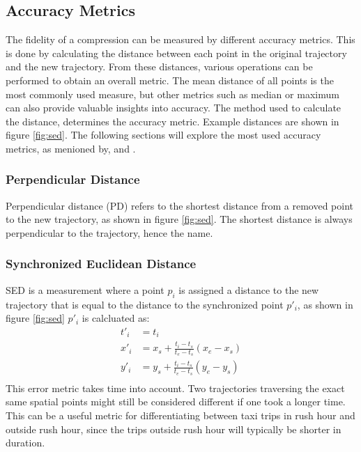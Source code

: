 
\subsection{Accuracy Metrics}
The fidelity of a compression can be measured by different accuracy metrics. This is done by calculating the distance between each point in the original trajectory and the new trajectory. From these distances, various operations can be performed to obtain an overall metric. The mean distance of all points is the most commonly used measure, but other metrics such as median or maximum can also provide valuable insights into accuracy. The method used to calculate the distance, determines the accuracy metric. Example distances are shown in figure \ref{fig:sed}. The following sections will explore the most used accuracy metrics, as menioned by, \cite{TrajFramework} and \cite{Sun2016}.

\subsubsection{Perpendicular Distance}
\label{foobar:PD}
Perpendicular distance (PD) refers to the shortest distance from a removed point to the new trajectory, as shown in figure \ref{fig:sed}. The shortest distance is always perpendicular to the trajectory, hence the name.

\subsubsection{Synchronized Euclidean Distance}
\label{subsub:SED}
SED is a measurement where a point $p_{i}$ is assigned a distance to the new trajectory that is equal to the distance to the synchronized point $p'_{i}$, as shown in figure \ref{fig:sed} $p'_{i}$ is calcluated as:
\begin{equation}
    \begin{aligned}
        t'_{i} & = t_{i}                                                \\
        x'_{i} & = x_{s} + \frac{t_{i}-t_{s}}{t_{e}-t_{s}}(x_{e}-x_{s}) \\
        y'_{i} & = y_{s} + \frac{t_{i}-t_{s}}{t_{e}-t_{s}}(y_{e}-y_{s}) \\
    \end{aligned}
\end{equation}
This error metric takes time into account. Two trajectories traversing the exact same spatial points might still be considered different if one took a longer time. This can be a useful metric for differentiating between taxi trips in rush hour and outside rush hour, since the trips outside rush hour will typically be shorter in duration.

